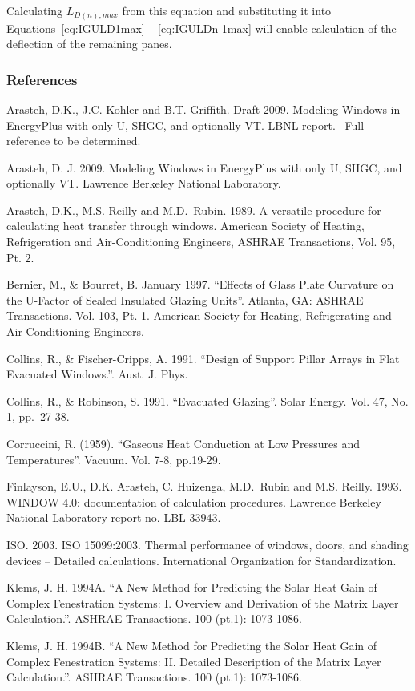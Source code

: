 Calculating \({L_{D\left( n \right),max}}\) from this equation and substituting it into Equations~\ref{eq:IGULD1max} -~\ref{eq:IGULDn-1max} will enable calculation of the deflection of the remaining panes.

\subsubsection{References}\label{references-1-019}

Arasteh, D.K., J.C. Kohler and B.T. Griffith. Draft 2009. Modeling Windows in EnergyPlus with only U, SHGC, and optionally VT. LBNL report.~ Full reference to be determined.

Arasteh, D. J. 2009. Modeling Windows in EnergyPlus with only U, SHGC, and optionally VT. Lawrence Berkeley National Laboratory.

Arasteh, D.K., M.S. Reilly and M.D.~Rubin. 1989. A versatile procedure for calculating heat transfer through windows. American Society of Heating, Refrigeration and Air-Conditioning Engineers, ASHRAE Transactions, Vol. 95, Pt. 2.

Bernier, M., \& Bourret, B. January 1997. ``Effects of Glass Plate Curvature on the U-Factor of Sealed Insulated Glazing Units''. Atlanta, GA: ASHRAE Transactions. Vol. 103, Pt. 1. American Society for Heating, Refrigerating and Air-Conditioning Engineers.

Collins, R., \& Fischer-Cripps, A. 1991. ``Design of Support Pillar Arrays in Flat Evacuated Windows.''. Aust. J. Phys.

Collins, R., \& Robinson, S. 1991. ``Evacuated Glazing''. Solar Energy. Vol. 47, No. 1, pp.~27-38.

Corruccini, R. (1959). ``Gaseous Heat Conduction at Low Pressures and Temperatures''. Vacuum. Vol. 7-8, pp.19-29.

Finlayson, E.U., D.K. Arasteh, C. Huizenga, M.D.~Rubin and M.S. Reilly. 1993. WINDOW 4.0: documentation of calculation procedures. Lawrence Berkeley National Laboratory report no. LBL-33943.

ISO. 2003. ISO 15099:2003. Thermal performance of windows, doors, and shading devices -- Detailed calculations. International Organization for Standardization.

Klems, J. H. 1994A. ``A New Method for Predicting the Solar Heat Gain of Complex Fenestration Systems: I. Overview and Derivation of the Matrix Layer Calculation.''. ASHRAE Transactions. 100 (pt.1): 1073-1086.

Klems, J. H. 1994B. ``A New Method for Predicting the Solar Heat Gain of Complex Fenestration Systems: II. Detailed Description of the Matrix Layer Calculation.''. ASHRAE Transactions. 100 (pt.1): 1073-1086.

